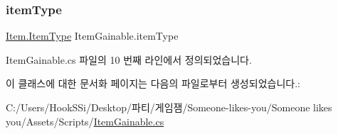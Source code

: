 \mbox{\label{class_item_gainable_a4e67d5e2a3aa8a8f4f15d7aa45880eda}} 
\subsubsection{\texorpdfstring{itemType}{itemType}}
{\footnotesize\ttfamily \mbox{\hyperlink{class_item_ab5eeb575e9d66ebcfef9b58b667fad05}{Item.\+Item\+Type}} Item\+Gainable.\+item\+Type}



Item\+Gainable.\+cs 파일의 10 번째 라인에서 정의되었습니다.



이 클래스에 대한 문서화 페이지는 다음의 파일로부터 생성되었습니다.\+:\begin{DoxyCompactItemize}
\item 
C\+:/\+Users/\+Hook\+S\+Si/\+Desktop/파티/게임잼/\+Someone-\/likes-\/you/\+Someone likes you/\+Assets/\+Scripts/\mbox{\hyperlink{_item_gainable_8cs}{Item\+Gainable.\+cs}}\end{DoxyCompactItemize}
